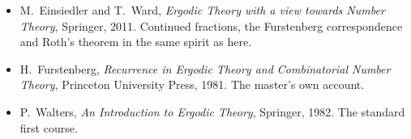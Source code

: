 \begin{itemize}
\emph{J.\ Analyse Math.}\ 31 (1977), 204--256. B.~Host and B.~Kra, ``Nonconventional ergodic averages and nilmanifolds'', \emph{Ann.\ of Math.}\ 161 (2005), 397--488. B.~Green and T.~Tao, ``The primes contain arbitrarily long arithmetic
progressions'', \emph{Ann.\ of Math.}\ 167 (2008), 481--547.
\item M.~Einsiedler and T.~Ward, \emph{Ergodic Theory with a view towards Number Theory}, Springer, 2011. Continued fractions, the Furstenberg correspondence and Roth's theorem in the same spirit as here.
\item H.~Furstenberg, \emph{Recurrence in Ergodic Theory and Combinatorial Number Theory}, Princeton University Press, 1981. The master's own account.
\item P.~Walters, \emph{An Introduction to Ergodic Theory}, Springer, 1982. The standard first course.
\end{itemize}
